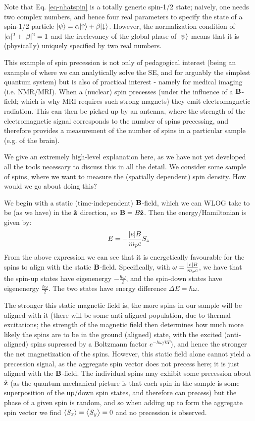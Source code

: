 Note that Eq. \eqref{eq-nhatspin} is a totally generic spin-1/2 state; naively, one needs two complex numbers, and hence four real parameters to specify the state of a spin-1/2 particle $\lvert \psi \rangle = \alpha\lvert \uparrow \rangle + \beta\lvert \downarrow \rangle$. However, the normalization condition of $\lvert \alpha \rvert^2 + \lvert \beta \rvert^2 = 1$ and the irrelevancy of the global phase of $\lvert \psi \rangle$ means that it is (physically) uniquely specified by two real numbers. 


This example of spin precession is not only of pedagogical interest (being an example of where we can analytically solve the SE, and for arguably the simplest quantum system) but is also of practical interest - namely for medical imaging (i.e.  NMR/MRI). When a (nuclear) spin precesses (under the influence of a $\mathbf{B}$-field; which is why MRI requires such strong magnets) they emit electromagnetic radiation. This can then be picked up by an antenna, where the strength of the electromagnetic signal corresponds to the number of spins precessing, and therefore provides a measurement of the number of spins in a particular sample (e.g. of the brain).

We give an extremely high-level explanation here, as we have not yet developed all the tools necessary to discuss this in all the detail. We consider some sample of spins, where we want to measure the (spatially dependent) spin density. How would we go about doing this?

We begin with a static (time-independent) $\mathbf{B}$-field, which we can WLOG take to be (as we have) in the $\hat{\mathbf{z}}$ direction, so $\mathbf{B} = B\hat{\mathbf{z}}$. Then the energy/Hamiltonian is given by:
\begin{equation}
    E = -\frac{\lvert e \rvert B}{m_p c}S_z
\end{equation}
From the above expression we can see that it is energetically favourable for the spins to align with the static $\mathbf{B}$-field. Specifically, with $\omega = \frac{\lvert e \rvert B}{m_p c}$, we have that the spin-up states have eigenenergy $-\frac{\hbar\omega}{2}$, and the spin-down states have eigenenergy $\frac{\hbar\omega}{2}$. The two states have energy difference $\Delta E = \hbar \omega$.

The stronger this static magnetic field is, the more spins in our sample will be aligned with it (there will be some anti-aligned population, due to thermal excitations; the strength of the magnetic field then determines how much more likely the spins are to be in the ground (aligned) state, with the excited (anti-aligned) spins supressed by a Boltzmann factor $e^{-\hbar \omega/k T}$), and hence the stronger the net magnetization of the spins. However, this static field alone cannot yield a precession signal, as the aggregate spin vector does not precess here; it is just aligned with the $\mathbf{B}$-field. The individual spins may exhibit some precession about $\hat{\mathbf{z}}$ (as the quantum mechanical picture is that each spin in the sample is some superposition of the up/down spin states, and therefore can precess) but the phase of a given spin is random, and so when adding up to form the aggregate spin vector we find $\left< S_x \right> = \left< S_y \right> = 0$ and no precession is observed. 

